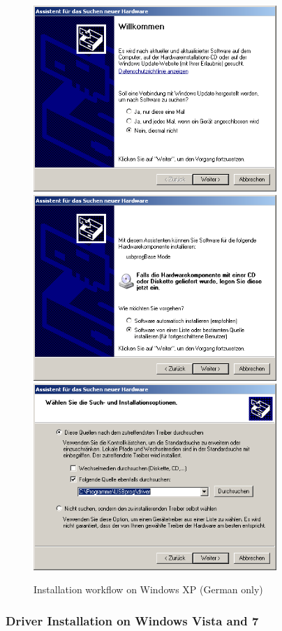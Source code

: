 \documentclass[bibtotoc,UKenglish,halfparskip,oneside,DIV12]{scrreprt}
\begin{document}
\begin{figure}[p]
  \centering
  \includegraphics[width=92mm]{images/win_xp_1.png}
  \includegraphics[width=92mm]{images/win_xp_2.png}
  \includegraphics[width=92mm]{images/win_xp_3.png}
  \caption{Installation workflow on Windows XP (German only)}
  \label{fig:inst_winxp}
\end{figure}

\subsubsection{Driver Installation on Windows Vista and 7}
\end{document}
